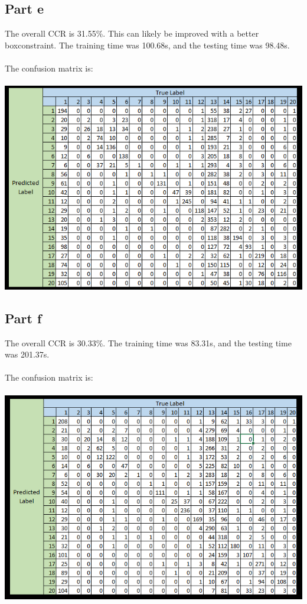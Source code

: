 \documentclass[paper=a4, fontsize=11pt]{scrartcl} %
\numberwithin{equation}{section} %
\numberwithin{figure}{section} %
\numberwithin{table}{section} %
\begin{document}
	\subsection{Part e}
	The overall CCR is 31.55\%. This can likely be improved with a better boxconstraint. The training time was 100.68s, and the testing time was 98.48s. 
	\\\\
	The confusion matrix is:
	\\\\
	\includegraphics{part_e_confusion_matrix}
	
	\newpage
	\subsection{Part f}
	The overall CCR is 30.33\%. The training time was 83.31s, and the testing time was 201.37s.
	\\\\
	The confusion matrix is:
	\\\\
	\includegraphics{part_f_confusion_matrix}
	
\end{document}
